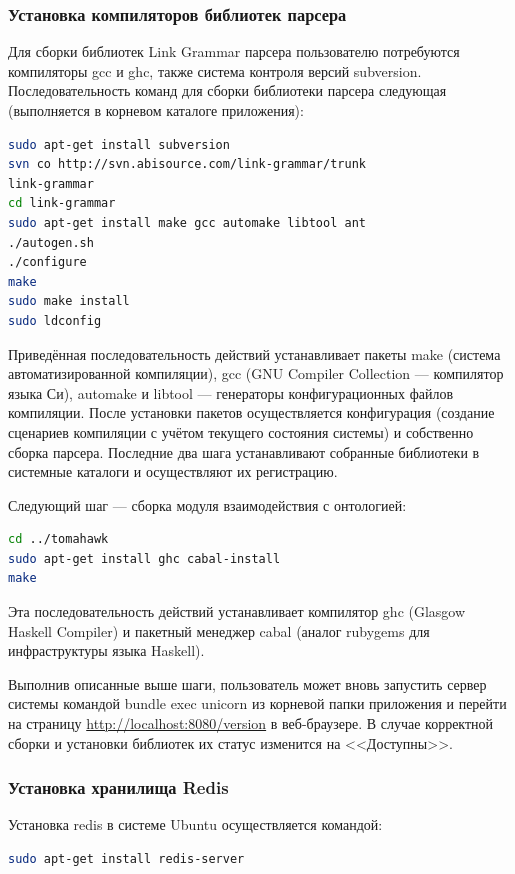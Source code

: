 \subsubsection{Установка компиляторов библиотек парсера}

Для сборки библиотек Link Grammar парсера пользователю потребуются
компиляторы gcc и ghc, также система контроля версий subversion.
Последовательность команд для сборки библиотеки парсера следующая
(выполняется в корневом каталоге приложения):

\begin{lstlisting}[language=bash]
sudo apt-get install subversion
svn co http://svn.abisource.com/link-grammar/trunk
link-grammar
cd link-grammar
sudo apt-get install make gcc automake libtool ant
./autogen.sh
./configure
make
sudo make install
sudo ldconfig
\end{lstlisting}

Приведённая последовательность действий устанавливает пакеты make
(система автоматизированной компиляции), gcc (GNU Compiler Collection ---
компилятор языка Си), automake и libtool --- генераторы конфигурационных
файлов компиляции. После установки пакетов осуществляется конфигурация
(создание сценариев компиляции с учётом текущего состояния системы) и
собственно сборка парсера. Последние два шага устанавливают собранные
библиотеки в системные каталоги и осуществляют их регистрацию.

Следующий шаг --- сборка модуля взаимодействия с онтологией:

\begin{lstlisting}[language=bash]
cd ../tomahawk
sudo apt-get install ghc cabal-install
make
\end{lstlisting}

Эта последовательность действий устанавливает компилятор ghc
(Glasgow Haskell Compiler) и пакетный менеджер cabal (аналог rubygems для
инфраструктуры языка Haskell).

Выполнив описанные выше шаги, пользователь может вновь запустить
сервер системы командой bundle exec unicorn из корневой папки
приложения и перейти на страницу \url{http://localhost:8080/version} в веб-браузере.
В случае корректной сборки и установки библиотек их статус изменится на
<<Доступны>>.

\subsubsection{Установка хранилища Redis}

Установка redis в системе Ubuntu осуществляется командой:
\begin{lstlisting}[language=bash]
sudo apt-get install redis-server
\end{lstlisting}

